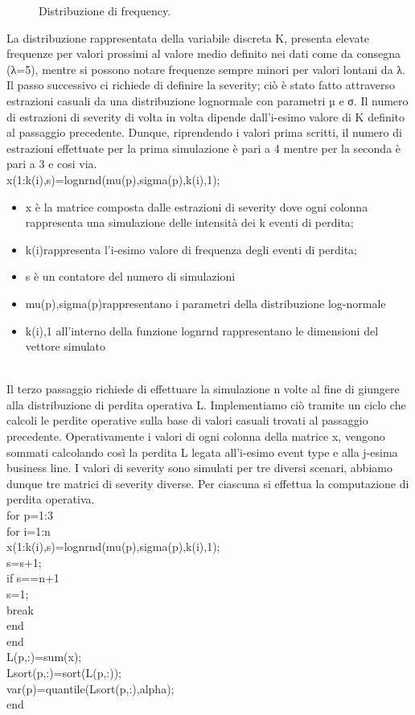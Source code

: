 \documentclass[titlepage]{article}
\begin{document}
\begin{itemize}
\begin{figure}[htbp]
	\caption{\label{fig:frog}Distribuzione di frequency.}
\end{figure}
La distribuzione rappresentata della variabile discreta K, presenta elevate frequenze per valori prossimi al valore medio definito nei dati come da consegna (λ=5), mentre si possono notare frequenze sempre minori per valori lontani da λ.
\\
Il passo successivo ci richiede di definire la severity; ciò è stato fatto attraverso estrazioni casuali da una distribuzione lognormale con parametri µ e σ. Il numero di estrazioni di severity di volta in volta dipende dall’i-esimo valore di K definito al passaggio precedente. Dunque, riprendendo i valori prima scritti, il numero di estrazioni effettuate per la prima simulazione è pari a 4 mentre per la seconda è pari a 3 e cosi via.
\\
x(1:k(i),s)=lognrnd(mu(p),sigma(p),k(i),1);
\begin{itemize}
\item x è la matrice composta dalle estrazioni di severity dove ogni colonna rappresenta una simulazione delle intensità dei k eventi di perdita;
\item k(i)rappresenta l’i-esimo valore di frequenza degli eventi di perdita;
\item s è un contatore del numero di simulazioni 
\item mu(p),sigma(p)rappresentano i parametri della distribuzione log-normale
\item k(i),1 all’interno della funzione lognrnd rappresentano le dimensioni del vettore simulato
\end{itemize}
\\
Il terzo passaggio richiede di effettuare la simulazione n volte al fine di giungere alla distribuzione di perdita operativa L. Implementiamo ciò tramite un ciclo che calcoli le perdite operative sulla base di valori casuali trovati al passaggio precedente. Operativamente i valori di ogni colonna della matrice x, vengono sommati calcolando così la perdita L legata all'i-esimo event type e alla j-esima business line. I valori di severity sono simulati per tre diversi scenari, abbiamo dunque tre matrici di severity diverse. Per ciascuna si effettua la computazione di perdita operativa.
\\

for p=1:3
\\
for i=1:n
\\
x(1:k(i),s)=lognrnd(mu(p),sigma(p),k(i),1);
\\
s=s+1;     
\\
if s==n+1
\\
s=1;
\\
break
\\
end
\\
end
\\
L(p,:)=sum(x); 
\\
Lsort(p,:)=sort(L(p,:));
\\
 var(p)=quantile(Lsort(p,:),alpha);
\\
end
\\


\end{itemize}
\end{document}
